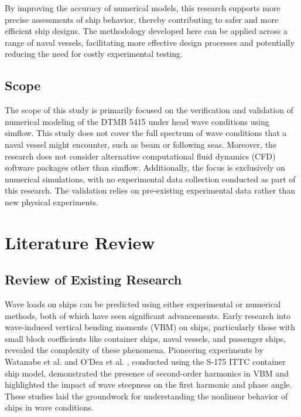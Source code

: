 \documentclass[12pt]{article} %
\begin{document}
By improving the accuracy of numerical models, this research supports more precise assessments of 
ship behavior, thereby contributing to safer and more efficient ship designs. The methodology 
developed here can be applied across a range of naval vessels, facilitating more effective design 
processes and potentially reducing the need for costly experimental testing.

\subsection{Scope}

The scope of this study is primarily focused on the verification and validation of numerical 
modeling of the DTMB 5415 under head wave conditions using simflow. This study does not cover the full 
spectrum of wave conditions that a naval vessel might encounter, 
such as beam or following seas. Moreover, the research does not consider alternative computational 
fluid dynamics (CFD) software packages other than simflow. Additionally, the focus is exclusively on numerical 
simulations, with no experimental data collection conducted as part of this research. The validation 
relies on pre-existing experimental data rather than new physical experiments.



\section{Literature Review}

\subsection{Review of Existing Research}
Wave loads on ships can be predicted using either experimental or numerical methods, both of which 
have seen significant advancements. Early research into wave-induced vertical bending moments (VBM) 
on ships, particularly those with small block coefficients like container ships, naval vessels, and 
passenger ships, revealed the complexity of these phenomena. Pioneering experiments by Watanabe et 
al. \cite{Watanabe1989} and O'Dea et al. \cite{ODea1992}, conducted using the S-175 ITTC container 
ship model, demonstrated the presence of second-order harmonics in VBM and highlighted the impact of 
wave steepness on the first harmonic and phase angle. These studies laid the groundwork for 
understanding the nonlinear behavior of ships in wave conditions.
\end{document}
